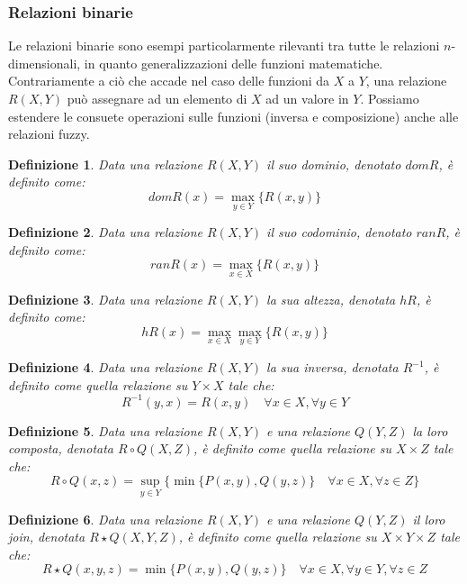 \documentclass[10pt,a4paper]{article}
\newtheorem{definition}{Definizione}
\begin{document}
\subsubsection{Relazioni binarie}

Le relazioni binarie sono esempi particolarmente rilevanti tra tutte le relazioni $n$-dimensionali, in quanto generalizzazioni delle funzioni matematiche. Contrariamente a ciò che accade nel caso delle funzioni da $X$ a $Y$, una relazione $R(X,Y)$ può assegnare ad un elemento di $X$ ad un valore in $Y$. Possiamo estendere le consuete operazioni sulle funzioni (inversa e composizione) anche alle relazioni fuzzy. 

\begin{definition}
Data una relazione $R(X,Y)$ il suo \emph{dominio}, denotato $dom R$, è definito come:
$$
dom R(x) = \max_{y \in Y}\{ R(x,y) \}
$$
\end{definition}

\begin{definition}
Data una relazione $R(X,Y)$ il suo \emph{codominio}, denotato $ran R$, è definito come:
$$
ran R(x) = \max_{x \in X}\{ R(x,y) \}
$$
\end{definition}

\begin{definition}
Data una relazione $R(X,Y)$ la sua \emph{altezza}, denotata $h R$, è definito come:
$$
h R(x) = \max_{x \in X} \max_{y \in Y} \{ R(x,y) \}
$$
\end{definition}

\begin{definition}
Data una relazione $R(X,Y)$ la sua \emph{inversa}, denotata $R^{-1}$, è definito come quella relazione su $Y \times X$ tale che:
$$
R^{-1} (y,x) = R(x,y) \quad \forall x \in X, \forall y \in Y
$$
\end{definition}

\begin{definition}
Data una relazione $R(X,Y)$ e una relazione $Q(Y,Z)$ la loro \emph{composta}, denotata $R \circ Q (X,Z)$, è definito come quella relazione su $X \times Z$ tale che:
$$
R \circ Q (x,z) = \sup_{y \in Y} \{ \min \{ P(x,y),Q(y,z)\} \quad \forall x \in X, \forall z \in Z \} 
$$
\end{definition}

\begin{definition}
Data una relazione $R(X,Y)$ e una relazione $Q(Y,Z)$ il loro \emph{join}, denotata $R \star Q (X,Y,Z)$, è definito come quella relazione su $X \times Y \times Z$ tale che:
$$
R \star Q (x,y,z) = \min \{ P(x,y),Q(y,z)\} \quad \forall x \in X, \forall y \in Y, \forall z \in Z 
$$
\end{definition}
\end{document}
